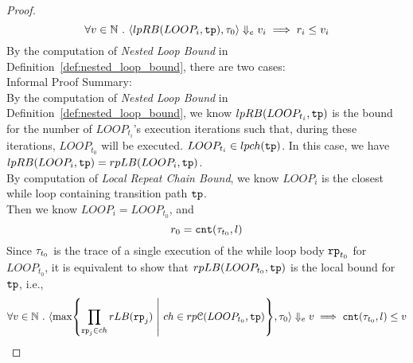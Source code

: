 \begin{proof}
% 
        \[
          \forall v \in \mathbb{N} ~.~ 
          \langle lpRB(LOOP_i, \mathtt{tp}), \mathtt{\tau}_0
           \rangle \Downarrow_e v_i 
          \implies  
          r_i \leq v_i
        \]   
  By the computation of \emph{Nested Loop Bound} in Definition~\ref{def:nested_loop_bound},
        there are two cases:
  \\
  Informal Proof Summary: 
  \\
  By the computation of \emph{Nested Loop Bound} in Definition~\ref{def:nested_loop_bound}, we know 
$lpRB(LOOP_{t_i}, \mathtt{tp})$ is the
bound for the number of $LOOP_{t_i}$'s execution iterations
such that, during these iterations, $LOOP_{t_0}$ will be executed. 
$LOOP_{t_i} \in lpch(\mathtt{tp})$.
%
        In this case, we have $lpRB(LOOP_i, \mathtt{tp}) = rpLB(LOOP_i, \mathtt{tp})$.
        \\
        By computation of \emph{Local Repeat Chain Bound}, we know 
        $LOOP_i$ is the closest while loop containing transition path $\mathtt{tp}$.
        \\
        Then we know $LOOP_i = LOOP_{t_0}$, and 
        \[
          r_0 = \mathtt{cnt}(\mathtt{\tau}_{t_0}, l)
        \]
    Since $\mathtt{\tau}_{t_0}$ is the trace of a single execution of the while loop body $\mathtt{rp}_{t_0}$ for $LOOP_{t_0}$,
    it is equivalent to show that $rpLB(LOOP_{t_0}, \mathtt{tp})$ is the local bound for $\mathtt{tp}$, i.e.,
        \[
            \forall v \in \mathbb{N} \st
            \config{
        \max \left\{ \prod\limits_{\rprog_j \in ch}  rLB(\rprog_j) 
        ~\middle\vert~ ch \in rp\mathcal{C}(LOOP_{t_0}, \tpath) \right\}, \trace_0
          } \earrow v \implies  \counter(\vtrace_{t_0}, l) \leq v
        \]

\end{proof}
